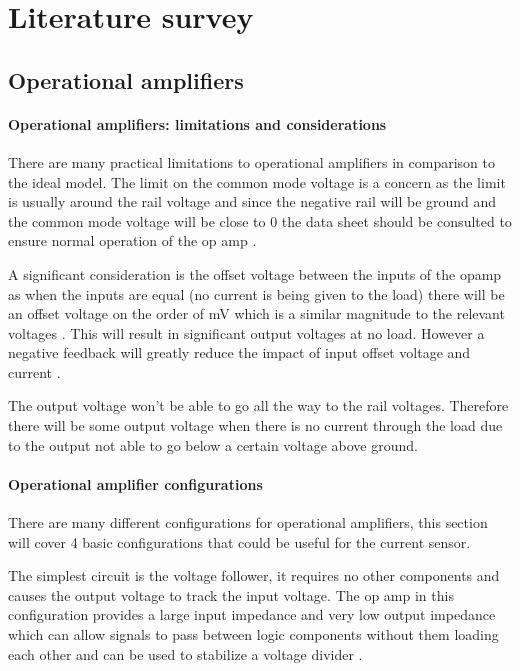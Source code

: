 \chapter{Literature survey}\label{chap:Lit}

\section{Operational amplifiers}\label{sec:opamps}

\subsubsection{Operational amplifiers: limitations and considerations}\label{sec:opamps_limits}
There are many practical limitations to operational amplifiers in comparison to the ideal model. The limit on the common mode voltage is a concern as the limit is usually around the rail voltage and since the negative rail will be ground and the common mode voltage will be close to 0 the data sheet should be consulted to ensure normal operation of the op amp \cite{NonIdeal_Opamps}. 

A significant consideration is the offset voltage between the inputs of the opamp as when the inputs are equal (no current is being given to the load) there will be an offset voltage on the order of mV which is a similar magnitude to the relevant voltages \cite{Lim_Opamps}. This will result in significant output voltages at no load. However a negative feedback will greatly reduce the impact of input offset voltage and current \cite{Lim_Opamps}.

The output voltage won't be able to go all the way to the rail voltages. Therefore there will be some output voltage when there is no current through the load due to the output not able to go below a certain voltage above ground.
\subsubsection{Operational amplifier configurations}\label{sec:opamps_configs}
There are many different configurations for operational amplifiers, this section will cover 4 basic configurations that could be useful for the current sensor.

The simplest circuit is the voltage follower, it requires no other components and causes the output voltage to track the input voltage. The op amp in this configuration provides a large input impedance and very low output impedance which can allow signals to pass between logic components without them loading each other and can be used to stabilize a voltage divider \cite{Fund_Opamps}.

